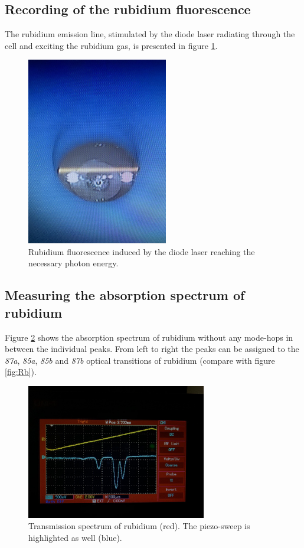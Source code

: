     \subsection{Recording of the rubidium fluorescence}
        The rubidium emission line, stimulated by the diode laser
        radiating through the cell and exciting the rubidium gas, is presented in figure \ref{fig:Flu}.
        \begin{figure}[h]
            \centering
            \includegraphics[width = 0.55\textwidth]{pictures/Flu.jpg}
            \caption{Rubidium fluorescence induced by the diode laser reaching the necessary photon energy.}
            \label{fig:Flu}
        \end{figure}
        \FloatBarrier
    \newpage
    \subsection{Measuring the absorption spectrum of rubidium}
        Figure \ref{fig:ES} shows the absorption spectrum of rubidium
        without any mode-hops in between the individual peaks.
        From left to right the peaks can be assigned to the
        \textit{87a}, \textit{85a}, \textit{85b} and \textit{87b}
        optical transitions of rubidium (compare with figure \ref{fig:Rb}).
        \begin{figure}[h]
            \centering
            \includegraphics[width = 0.7\textwidth]{pictures/Emissionsspektrum.jpg}
            \caption{Transmission spectrum of rubidium (red).
                        The piezo-sweep is highlighted as well (blue).}
            \label{fig:ES}
        \end{figure}
